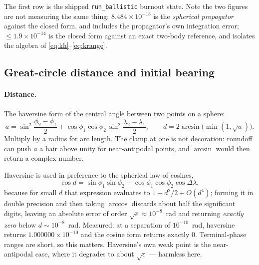 \documentclass[11pt]{article}
\newcommand{\code}[1]{\texttt{#1}}
\begin{document}
The first row is the shipped \code{run\_ballistic} burnout state. Note the two
figures are not measuring the same thing: $8.484\times10^{-13}$ is the
\emph{spherical propagator} against the closed form, and includes the
propagator's own integration error; $\le 1.9\times10^{-14}$ is the closed form
against an exact two-body reference, and isolates the algebra of
\eqref{eq:kh}--\eqref{eq:krange}.

\subsection{Great-circle distance and initial bearing}
\label{sec:gc}

\paragraph{Distance.} The haversine form of the central angle between two
points on a sphere:
\begin{equation}
  a = \sin^2\!\frac{\phi_2-\phi_1}{2}
      + \cos\phi_1\cos\phi_2\,\sin^2\!\frac{\lambda_2-\lambda_1}{2},
  \qquad
  d = 2\arcsin\bigl(\min(1,\sqrt{a})\bigr) .
  \label{eq:haversine}
\end{equation}
Multiply by a radius for arc length. The clamp at one is not decoration:
roundoff can push $a$ a hair above unity for near-antipodal points, and
$\arcsin$ would then return a complex number.

Haversine is used in preference to the spherical law of cosines,
\begin{equation*}
  \cos d = \sin\phi_1\sin\phi_2 + \cos\phi_1\cos\phi_2\cos\Delta\lambda ,
\end{equation*}
because for small $d$ that expression evaluates to $1 - d^2/2 + O(d^4)$;
forming it in double precision and then taking $\arccos$ discards about half
the significant digits, leaving an absolute error of order
$\sqrt{\epsilon}\approx 10^{-8}$~rad and returning \emph{exactly zero} below
$d\sim 10^{-8}$~rad. Measured: at a separation of $10^{-10}$~rad, haversine
returns $1.000000\times10^{-10}$ and the cosine form returns exactly $0$.
Terminal-phase ranges are short, so this matters. Haversine's own weak point is the
near-antipodal case, where it degrades to about $\sqrt{\epsilon}$ --- harmless
here.
\end{document}
